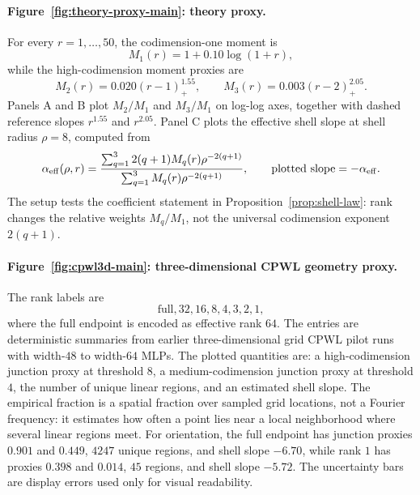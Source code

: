 \paragraph{Figure~\ref{fig:theory-proxy-main}: theory proxy.}
For every $r=1,\ldots,50$, the codimension-one moment is
\begin{equation}
M_1(r)=1+0.10\log(1+r),
\end{equation}
while the high-codimension moment proxies are
\begin{equation}
M_2(r)=0.020(r-1)_+^{1.55},
\qquad
M_3(r)=0.003(r-2)_+^{2.05}.
\end{equation}
Panels A and B plot $M_2/M_1$ and $M_3/M_1$ on log-log axes, together with dashed reference slopes $r^{1.55}$ and $r^{2.05}$. Panel C plots the effective shell slope at shell radius $\rho=8$, computed from
\begin{equation}
\alpha_{\rm eff}(\rho,r)
=
\frac{
\sum_{q=1}^3 2(q+1)M_q(r)\rho^{-2(q+1)}
}{
\sum_{q=1}^3 M_q(r)\rho^{-2(q+1)}
},
\qquad
\text{plotted slope}=-\alpha_{\rm eff}.
\end{equation}
The setup tests the coefficient statement in Proposition~\ref{prop:shell-law}: rank changes the relative weights $M_q/M_1$, not the universal codimension exponent $2(q+1)$.

\paragraph{Figure~\ref{fig:cpwl3d-main}: three-dimensional CPWL geometry proxy.}
The rank labels are
\begin{equation}
\text{full},32,16,8,4,3,2,1,
\end{equation}
where the full endpoint is encoded as effective rank $64$. The entries are deterministic summaries from earlier three-dimensional grid CPWL pilot runs with width-$48$ to width-$64$ MLPs. The plotted quantities are: a high-codimension junction proxy at threshold $8$, a medium-codimension junction proxy at threshold $4$, the number of unique linear regions, and an estimated shell slope. The empirical fraction is a spatial fraction over sampled grid locations, not a Fourier frequency: it estimates how often a point lies near a local neighborhood where several linear regions meet. For orientation, the full endpoint has junction proxies $0.901$ and $0.449$, $4247$ unique regions, and shell slope $-6.70$, while rank $1$ has proxies $0.398$ and $0.014$, $45$ regions, and shell slope $-5.72$. The uncertainty bars are display errors used only for visual readability.

